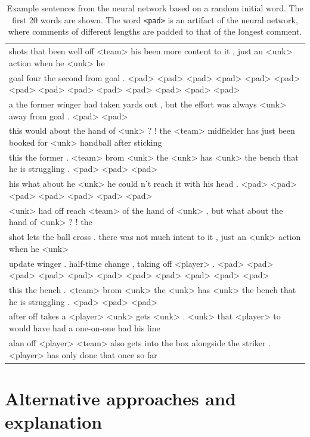 \documentclass[10pt, a4paper]{UUThesisTemplate}
\begin{document}
\begin{table}[t]\scriptsize
\begin{tabular}{l}
\hline
shots that been well off <team> his been more content to it , just an <unk> action when he <unk> he\\
goal four the second from goal . <pad> <pad> <pad> <pad> <pad> <pad> <pad> <pad> <pad> <pad> <pad> <pad> <pad> <pad>\\
a the former winger had taken yards out , but the effort was always <unk> away from goal . <pad> <pad>\\
this would about the hand of <unk> ? ! the <team> midfielder has just been booked for <unk> handball after sticking\\
this the former . <team> brom <unk> the <unk> has <unk> the bench that he is struggling . <pad> <pad> <pad>\\
his what about he <unk> he could n't reach it with his head . <pad> <pad> <pad> <pad> <pad> <pad> <pad>\\
<unk> had off reach <team> of the hand of <unk> , but what about the hand of <unk> ? ! the\\
shot lets the ball cross . there was not much intent to it , just an <unk> action when he <unk>\\
update winger . half-time change , taking off <player> . <pad> <pad> <pad> <pad> <pad> <pad> <pad> <pad> <pad> <pad> <pad>\\
this the bench . <team> brom <unk> the <unk> has <unk> the bench that he is struggling . <pad> <pad> <pad>\\
after off takes a <player> <unk> gets <unk> . <unk> that <player> to would have had a one-on-one had his line\\
alan off <player> <team> also gets into the box alongside the striker . <player> has only done that once so far\\\hline
\end{tabular}
\caption{Example sentences from the neural network based on a random initial word. The first 20 words are shown. The word \texttt{<pad>} is an artifact of the neural network, where comments of different lengths are padded to that of the longest comment.}\label{tab:smallnnsentence}
\end{table}

\section{Alternative approaches and explanation}
\end{document}
